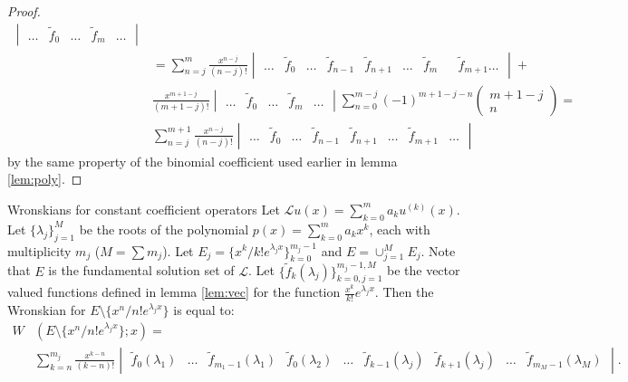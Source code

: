 \documentclass{book}
\begin{document}
\begin{proof}
\begin{align*}
\begin{vmatrix} \dots & \tilde{f}_0 & \dots & \tilde{f}_m & \dots \end{vmatrix} \\
& = \sum_{n=j}^m \frac{x^{n-j}}{(n-j)!} \begin{vmatrix} \dots & \tilde{f}_0 & \dots & \tilde{f}_{n-1} & \tilde{f}_{n+1} & \dots & \tilde{f}_m & & \tilde{f}_{m+1} \dots \end{vmatrix} + \\
& \frac{x^{m+1-j}}{(m+1-j)!}
\begin{vmatrix} \dots & \tilde{f}_0 & \dots & \tilde{f}_m & \dots \end{vmatrix}
\sum_{n=0}^{m-j} (-1)^{m+1-j-n} \begin{pmatrix} m+1-j \\ n \end{pmatrix} = \\
& \sum_{n=j}^{m+1} \frac{x^{n-j}}{(n-j)!} \begin{vmatrix} \dots & \tilde{f}_0 & \dots & \tilde{f}_{n-1} & \tilde{f}_{n+1} & \dots & \tilde{f}_{m+1} & \dots \end{vmatrix}
\end{align*}
by the same property of the binomial coefficient used earlier in lemma \ref{lem:poly}.
\end{proof}

\begin{thm}{Wronskians for constant coefficient operators}
Let $\mathcal{L} u(x) = \sum_{k=0}^m a_k u^{(k)}(x)$.
Let $\{ \lambda_j \}_{j=1}^M$ be the roots of the polynomial $p(x) = \sum_{k=0}^m a_k x^k$, each with multiplicity $m_j$ ($M = \sum m_j$).
Let $E_j = \{ x^k/k! e^{\lambda_j x} \}_{k=0}^{m_j-1}$ and $E = \cup_{j=1}^M E_j$.
Note that $E$ is the fundamental solution set of $\mathcal{L}$.
Let $\{ \tilde{f}_k(\lambda_j) \}_{k=0,j=1}^{m_j-1,M}$ be the vector valued functions defined in lemma \ref{lem:vec} for the function $\frac{x^k}{k!} e^{\lambda_j x}$.
Then the Wronskian for $E \setminus \{ x^n/n! e^{\lambda_j x} \}$ is equal to:
\begin{align*}
W & (E \setminus \{ x^n/n! e^{\lambda_j x} \} ; x) = \\
& \sum_{k=n}^{m_j} \frac{x^{k-n}}{(k-n)!} \begin{vmatrix} \tilde{f}_0(\lambda_1) & \dots & \tilde{f}_{m_1-1}(\lambda_1) & \tilde{f}_0(\lambda_2) & \dots
& \tilde{f}_{k-1}(\lambda_j) & \tilde{f}_{k+1}(\lambda_j) & \dots & \tilde{f}_{m_M-1}(\lambda_M) \end{vmatrix} .
\end{align*} \label{thm:wcc}
\end{thm}
\end{document}
